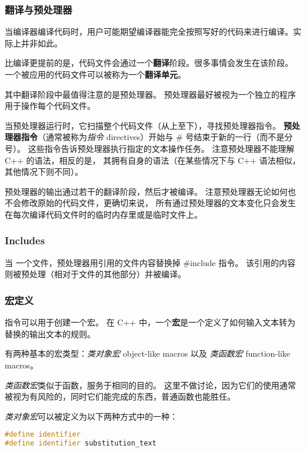 \documentclass[../../LearnCpp.tex]{subfiles}
\begin{document}

\subsubsection*{翻译与预处理器}

当编译器编译代码时，用户可能期望编译器能完全按照写好的代码来进行编译。实际上并非如此。

比编译更提前的是，代码文件会通过一个\textbf{翻译}阶段。很多事情会发生在该阶段。
一个被应用的代码文件可以被称为一个\textbf{翻译单元}。

其中翻译阶段中最值得注意的是预处理器。
预处理器最好被视为一个独立的程序用于操作每个代码文件。

当预处理器运行时，它扫描整个代码文件（从上至下），寻找预处理器指令。
\textbf{预处理器指令}（通常被称为\textit{指令} directives）开始与 \# 号结束于新的一行（而不是分号）。
这些指令告诉预处理器执行指定的文本操作任务。
注意预处理器不能理解 C++ 的语法，相反的是，
其拥有自身的语法（在某些情况下与 C++ 语法相似，其他情况下则不同）。

预处理器的输出通过若干的翻译阶段，然后才被编译。
注意预处理器无论如何也不会修改原始的代码文件，更确切来说，
所有通过预处理器的文本变化只会发生在每次编译代码文件时的临时内存里或是临时文件上。

\subsubsection*{Includes}

当  一个文件，预处理器用引用的文件内容替换掉 \#include 指令。
该引用的内容则被预处理（相对于文件的其他部分）并被编译。

\subsubsection*{宏定义}

 指令可以用于创建一个宏。
在 C++ 中，一个\textbf{宏}是一个定义了如何输入文本转为替换的输出文本的规则。

有两种基本的宏类型：\textit{类对象宏} object-like macros 以及 \textit{类函数宏} function-like macros。

\textit{类函数宏}类似于函数，服务于相同的目的。
这里不做讨论，因为它们的使用通常被视为有风险的，同时它们能完成的东西，普通函数也能胜任。

\textit{类对象宏}可以被定义为以下两种方式中的一种：

\begin{lstlisting}[language=C++]
#define identifier
#define identifier substitution_text
\end{lstlisting}
\end{document}
